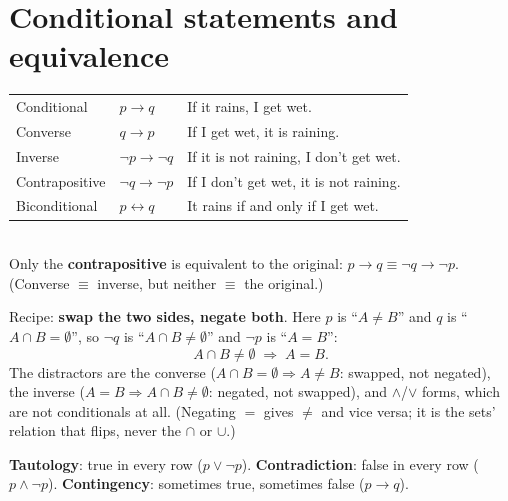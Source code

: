 \documentclass{fkt-notes}
\newcommand{\src}[1]{\par\noindent{\small\itshape Source: #1}\par\smallskip}
\newcommand{\kolman}[1]{\setcounter{section}{\numexpr#1-1\relax}}
\theoremstyle{definition}
\begin{document}
\kolman{2}
\section{Conditional statements and equivalence}\src{Kolman 2.2}\label{qg:logic}
%

\begin{keybox}[title={The conditional family ($p$: it is raining, $q$: I get wet)}]
  \begin{tabular}{@{}lll@{}}
    Conditional    & $p\to q$             & If it rains, I get wet.                \\
    Converse       & $q\to p$             & If I get wet, it is raining.           \\
    Inverse        & $\neg p\to\neg q$    & If it is not raining, I don't get wet. \\
    Contrapositive & $\neg q\to\neg p$    & If I don't get wet, it is not raining. \\
    Biconditional  & $p\leftrightarrow q$ & It rains if and only if I get wet.
  \end{tabular}\\[3pt]
  Only the \textbf{contrapositive} is equivalent to the original:
  $p\to q\equiv\neg q\to\neg p$. (Converse $\equiv$ inverse, but neither
  $\equiv$ the original.)
\end{keybox}

\begin{example}[MC practice: contrapositive of $A\ne B\Rightarrow A\cap B=\emptyset$]
  Recipe: \textbf{swap the two sides, negate both}. Here $p$ is
  ``$A\ne B$'' and $q$ is ``$A\cap B=\emptyset$'', so
  $\neg q$ is ``$A\cap B\ne\emptyset$'' and $\neg p$ is ``$A=B$'':
  \[A\cap B\ne\emptyset\;\Rightarrow\;A=B.\]
  The distractors are the converse ($A\cap B=\emptyset\Rightarrow A\ne B$:
  swapped, not negated), the inverse ($A=B\Rightarrow A\cap B\ne\emptyset$:
  negated, not swapped), and $\wedge$/$\vee$ forms, which are not
  conditionals at all. (Negating $=$ gives $\ne$ and vice versa; it is the
  sets' relation that flips, never the $\cap$ or $\cup$.)
\end{example}

\textbf{Tautology}: true in every row ($p\vee\neg p$).
\textbf{Contradiction}: false in every row ($p\wedge\neg p$).
\textbf{Contingency}: sometimes true, sometimes false ($p\to q$).
\end{document}
